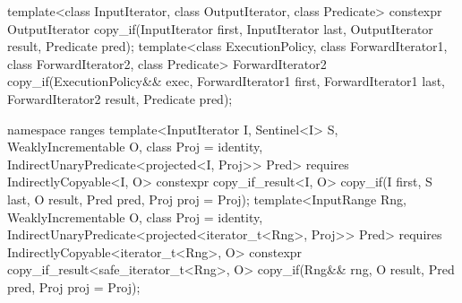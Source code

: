 %
\begin{itemdecl}
template<class InputIterator, class OutputIterator, class Predicate>
  constexpr OutputIterator copy_if(InputIterator first, InputIterator last,
                                   OutputIterator result, Predicate pred);
template<class ExecutionPolicy, class ForwardIterator1, class ForwardIterator2,
         class Predicate>
  ForwardIterator2 copy_if(ExecutionPolicy&& exec,
                           ForwardIterator1 first, ForwardIterator1 last,
                           ForwardIterator2 result, Predicate pred);
\end{itemdecl}
\begin{addedblock}\begin{itemdecl}
namespace ranges {
  template<InputIterator I, Sentinel<I> S, WeaklyIncrementable O, class Proj = identity,
      IndirectUnaryPredicate<projected<I, Proj>> Pred>
    requires IndirectlyCopyable<I, O>
    constexpr copy_if_result<I, O>
      copy_if(I first, S last, O result, Pred pred, Proj proj = Proj{});
  template<InputRange Rng, WeaklyIncrementable O, class Proj = identity,
      IndirectUnaryPredicate<projected<iterator_t<Rng>, Proj>> Pred>
    requires IndirectlyCopyable<iterator_t<Rng>, O>
    constexpr copy_if_result<safe_iterator_t<Rng>, O>
      copy_if(Rng&& rng, O result, Pred pred, Proj proj = Proj{});
}
\end{itemdecl}\end{addedblock}

